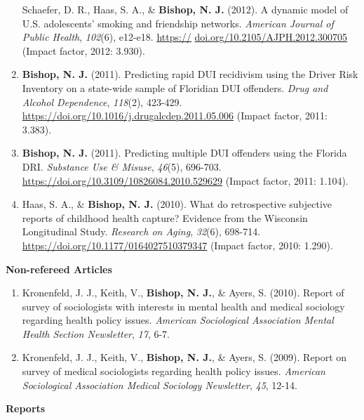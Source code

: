 \documentclass[
]{article}
\begin{document}
\begin{enumerate}
  Schaefer, D. R., Haas, S. A., \& \textbf{Bishop, N. J.} (2012). A
  dynamic model of U.S. adolescents' smoking and friendship networks.
  \emph{American Journal of Public Health}, \emph{102}(6), e12-e18.
  \href{https://}{\ul{https://}}
  \href{https://doi.org/10.2105/AJPH.2012.300705}{doi.org/10.2105/AJPH.2012.300705}
  (Impact factor, 2012: 3.930).
\item
  \textbf{Bishop, N. J.} (2011). Predicting rapid DUI recidivism using
  the Driver Risk Inventory on a state-wide sample of Floridian DUI
  offenders. \emph{Drug and Alcohol Dependence}, \emph{118}(2), 423-429.
  \url{https://doi.org/10.1016/j.drugalcdep.2011.05.006} (Impact factor,
  2011: 3.383).
\item
  \textbf{Bishop, N. J.} (2011). Predicting multiple DUI offenders using
  the Florida DRI. \emph{Substance Use \& Misuse}, \emph{46}(5),
  696-703. \url{https://doi.org/10.3109/10826084.2010.529629} (Impact
  factor, 2011: 1.104).
\item
  Haas, S. A., \& \textbf{Bishop, N. J.} (2010). What do retrospective
  subjective reports of childhood health capture? Evidence from the
  Wisconsin Longitudinal Study. \emph{Research on Aging}, \emph{32}(6),
  698-714. \url{https://doi.org/10.1177/0164027510379347} (Impact
  factor, 2010: 1.290).
\end{enumerate}

\textbf{Non-refereed Articles}

\begin{enumerate}
\def\labelenumi{\arabic{enumi}.}
\item
  Kronenfeld, J. J., Keith, V., \textbf{Bishop, N. J.}, \& Ayers, S.
  (2010). Report of survey of sociologists with interests in mental
  health and medical sociology regarding health policy issues.
  \emph{American Sociological Association Mental Health Section
  Newsletter}, \emph{17}, 6-7.
\item
  Kronenfeld, J. J., Keith, V., \textbf{Bishop, N. J.}, \& Ayers, S.
  (2009). Report on survey of medical sociologists regarding health
  policy issues. \emph{American Sociological Association Medical
  Sociology Newsletter}, \emph{45}, 12-14.
\end{enumerate}

\textbf{Reports}
\end{document}
